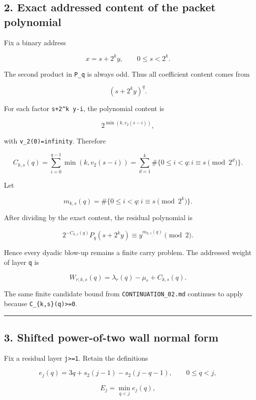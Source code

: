 \documentclass[11pt,letterpaper]{article}
\begin{document}
\subsection{2. Exact addressed content of the packet polynomial}\label{exact-addressed-content-of-the-packet-polynomial}

Fix a binary address

\[
x=s+2^k y,\qquad 0\le s<2^k.
\]

The second product in \texttt{P\_q} is always odd. Thus all coefficient content comes from

\[
(s+2^k y)^{\underline q}.
\]

For each factor \texttt{s+2\^{}k\ y-i}, the polynomial content is

\[
2^{\min(k,v_2(s-i))},
\]

with \texttt{v\_2(0)=infinity}. Therefore

\[
\boxed{
C_{k,s}(q)
=\sum_{i=0}^{q-1}\min(k,v_2(s-i))
=\sum_{d=1}^{k}\#\{0\le i<q:i\equiv s\pmod{2^d}\}.
}
\]

Let

\[
m_{k,s}(q)
=\#\{0\le i<q:i\equiv s\pmod{2^k}\}.
\]

After dividing by the exact content, the residual polynomial is

\[
\boxed{
2^{-C_{k,s}(q)}P_q(s+2^k y)
\equiv y^{\underline{m_{k,s}(q)}}\pmod2.
}
\]

Hence every dyadic blow-up remains a finite carry problem. The addressed weight of layer \texttt{q} is

\[
\boxed{
W_{r;k,s}(q)=\lambda_r(q)-\mu_r+C_{k,s}(q).
}
\]

The same finite candidate bound from \texttt{CONTINUATION\_02.md} continues to apply because \texttt{C\_\{k,s\}(q)\textgreater{}=0}.

\begin{center}\rule{0.5\linewidth}{0.5pt}\end{center}

\subsection{3. Shifted power-of-two wall normal form}\label{shifted-power-of-two-wall-normal-form}

Fix a residual layer \texttt{j\textgreater{}=1}. Retain the definitions

\[
e_j(q)=3q+s_2(j-1)-s_2(j-q-1),\qquad 0\le q<j,
\]

\[
E_j=\min_{q<j}e_j(q),
\]
\end{document}
